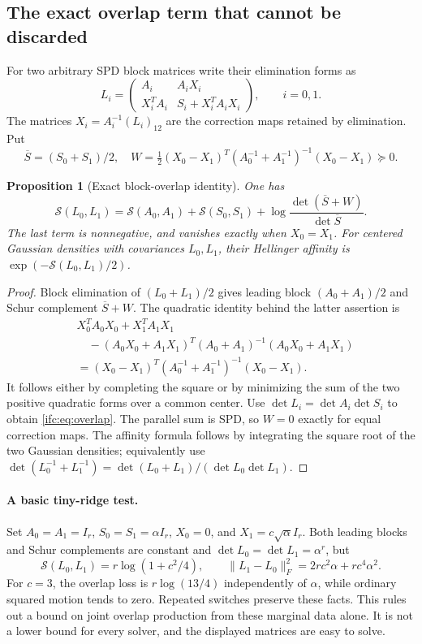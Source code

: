 \documentclass[11pt]{amsart}
\newtheorem{proposition}[theorem]{Proposition}
\theoremstyle{definition}\newtheorem{definition}[theorem]{Definition}
\theoremstyle{remark}\newtheorem{remark}[theorem]{Remark}
\numberwithin{equation}{section}
\newcommand{\Sc}{\mathcal S}
\begin{document}
\subsection{The exact overlap term that cannot be discarded}
For two arbitrary SPD block matrices write their elimination forms as
\[
 L_i=\begin{pmatrix}
 A_i&A_iX_i\\
 X_i^TA_i&S_i+X_i^TA_iX_i
 \end{pmatrix},\qquad i=0,1.
\]
The matrices $X_i=A_i^{-1}(L_i)_{12}$ are the correction maps retained
by elimination. Put
\[
 \overline S=(S_0+S_1)/2,
 \quad W=\tfrac12(X_0-X_1)^T
          (A_0^{-1}+A_1^{-1})^{-1}(X_0-X_1)\succeq0.
\]
\begin{proposition}[Exact block-overlap identity]\label{ifc:prop:overlap}
One has
\begin{equation}\label{ifc:eq:overlap}
 \Sc(L_0,L_1)=\Sc(A_0,A_1)+\Sc(S_0,S_1)
 +\log\frac{\det(\overline S+W)}{\det\overline S}.
\end{equation}
The last term is nonnegative, and vanishes exactly when $X_0=X_1$.
For centered Gaussian densities with covariances $L_0,L_1$, their
Hellinger affinity is $\exp(-\Sc(L_0,L_1)/2)$.
\end{proposition}
\begin{proof}
Block elimination of $(L_0+L_1)/2$ gives leading block
$(A_0+A_1)/2$ and Schur complement $\overline S+W$. The quadratic
identity behind the latter assertion is
\begin{align*}
 &X_0^TA_0X_0+X_1^TA_1X_1\\
 &\quad-(A_0X_0+A_1X_1)^T(A_0+A_1)^{-1}(A_0X_0+A_1X_1)\\
 &=(X_0-X_1)^T(A_0^{-1}+A_1^{-1})^{-1}(X_0-X_1).
\end{align*}
It follows either by completing the square or by minimizing the sum
of the two positive quadratic forms over a common center.
Use $\det L_i=\det A_i\det S_i$ to obtain \eqref{ifc:eq:overlap}.
The parallel sum is SPD, so $W=0$ exactly for equal correction maps.
The affinity formula follows by integrating the square root of the
two Gaussian densities; equivalently use
$\det(L_0^{-1}+L_1^{-1})=\det(L_0+L_1)/(\det L_0\det L_1)$.
\end{proof}

\paragraph{A basic tiny-ridge test.}
Set $A_0=A_1=I_r$, $S_0=S_1=\alpha I_r$, $X_0=0$, and
$X_1=c\sqrt\alpha I_r$. Both leading blocks and Schur complements
are constant and $\det L_0=\det L_1=\alpha^r$, but
\begin{equation}\label{ifc:eq:shear}
 \Sc(L_0,L_1)=r\log(1+c^2/4),\qquad
 \|L_1-L_0\|_F^2=2rc^2\alpha+rc^4\alpha^2.
\end{equation}
For $c=3$, the overlap loss is $r\log(13/4)$ independently of
$\alpha$, while ordinary squared motion tends to zero. Repeated
switches preserve these facts. This rules out a bound on joint overlap
production from these marginal data alone. It is not a lower bound
for every solver, and the displayed matrices are easy to solve.
\end{document}

